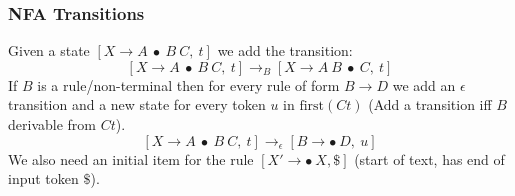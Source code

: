 \documentclass{report}
\begin{document}
\subsubsection*{NFA Transitions}
Given a state $[X \to A \ \bullet \ B \ C, \ t]$ we add the transition:
\[[X \to A \ \bullet \ B \ C, \ t] \to_B [X \to A \ B \ \bullet \ C, \ t]\]
If $B$ is a rule/non-terminal then for every rule of form $B \to D$ we add an $\epsilon$ transition and a new state for every token $u$ in $\text{first}(Ct)$ (Add a transition iff $B$ derivable from $Ct$).
\[[X \to A \ \bullet \ B \ C, \ t] \to_\epsilon [B \to \bullet \ D, \ u]\]
We also need an initial item for the rule $[X' \to \bullet \ X, \$]$ (start of text, has end of input token $\$$).

\end{document}
